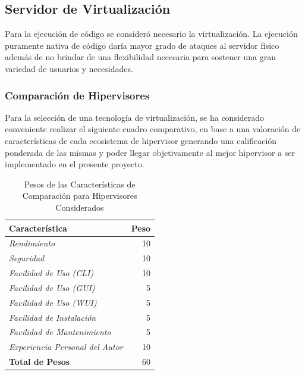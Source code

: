 \subsection{Servidor de Virtualización}
Para la ejecución de código se consideró necesario la virtualización. La ejecución puramente nativa de código daría mayor grado de ataques al servidor físico además de no brindar de una flexibilidad necesaria para sostener una gran variedad de usuarios y necesidades.

\subsubsection{Comparación de Hipervisores}
Para la selección de una tecnología de virtualización, se ha considerado conveniente realizar el siguiente cuadro comparativo, en base a una valoración de características de cada ecosistema de hipervisor generando una calificación ponderada de las mismas y poder llegar objetivamente al mejor hipervisor a ser implementado en el presente proyecto.

\begin{table}
	\centering
	\begin{tabular}{|l|r|}
    	\hline
		\textbf{Característica} & \textbf{Peso} \\
        \hline
        \textit{Rendimiento} & 10 \\
        \textit{Seguridad} & 10 \\
        \textit{Facilidad de Uso (CLI)} & 10 \\
        \textit{Facilidad de Uso (GUI)} & 5 \\
        \textit{Facilidad de Uso (WUI)} & 5 \\
        \textit{Facilidad de Instalación} & 5 \\
        \textit{Facilidad de Mantenimiento} & 5 \\
        \textit{Experiencia Personal del Autor} & 10 \\
        \hline
        \textbf{Total de Pesos} & 60 \\
        \hline
	\end{tabular}
    \caption{Pesos de las Características de Comparación para Hipervisores Considerados}
    \label{tab:hipervisor-compar-pesos}
\end{table}

